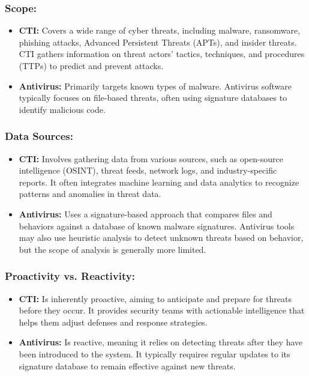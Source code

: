 \documentclass[a4paper,twoside,12pt]{report}
\begin{document}
\subsubsection{Scope:}
\begin{itemize}
    \item \textbf{CTI:} Covers a wide range of cyber threats, including malware, ransomware, phishing attacks, Advanced Persistent Threats (APTs), and insider threats. CTI gathers information on threat actors’ tactics, techniques, and procedures (TTPs) to predict and prevent attacks.
    
    \item \textbf{Antivirus:} Primarily targets known types of malware. Antivirus software typically focuses on file-based threats, often using signature databases to identify malicious code.
\end{itemize}

\subsubsection{Data Sources:}
\begin{itemize}
    \item \textbf{CTI:} Involves gathering data from various sources, such as open-source intelligence (OSINT), threat feeds, network logs, and industry-specific reports. It often integrates machine learning and data analytics to recognize patterns and anomalies in threat data.
    
    \item \textbf{Antivirus:} Uses a signature-based approach that compares files and behaviors against a database of known malware signatures. Antivirus tools may also use heuristic analysis to detect unknown threats based on behavior, but the scope of analysis is generally more limited.
\end{itemize}

\subsubsection{Proactivity vs. Reactivity:}
\begin{itemize}
    \item \textbf{CTI:} Is inherently proactive, aiming to anticipate and prepare for threats before they occur. It provides security teams with actionable intelligence that helps them adjust defenses and response strategies.
    
    \item \textbf{Antivirus:} Is reactive, meaning it relies on detecting threats after they have been introduced to the system. It typically requires regular updates to its signature database to remain effective against new threats.
\end{itemize}
\end{document}
